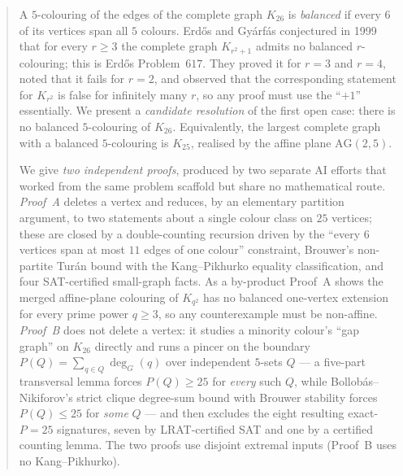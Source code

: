 \documentclass[11pt,reqno]{amsart}
\theoremstyle{definition}
\theoremstyle{remark}
\begin{document}
\begin{abstract}
A $5$-colouring of the edges of the complete graph $K_{26}$ is \emph{balanced} if
every $6$ of its vertices span all $5$ colours. Erd\H{o}s and Gy\'arf\'as
conjectured in 1999 that for every $r\ge 3$ the complete graph $K_{r^2+1}$ admits
no balanced $r$-colouring; this is Erd\H{o}s Problem~$617$. They proved it for
$r=3$ and $r=4$, noted that it fails for $r=2$, and observed that the
corresponding statement for $K_{r^2}$ is false for infinitely many $r$, so any
proof must use the ``$+1$'' essentially. We present a \emph{candidate resolution}
of the first open case: there is no balanced $5$-colouring of $K_{26}$.
Equivalently, the largest complete graph with a balanced $5$-colouring is $K_{25}$,
realised by the affine plane $\mathrm{AG}(2,5)$.

We give \emph{two independent proofs}, produced by two separate AI efforts that
worked from the same problem scaffold but share no mathematical route.
\emph{Proof~A} deletes a vertex and reduces, by an elementary partition argument, to
two statements about a single colour class on $25$ vertices; these are closed by a
double-counting recursion driven by the ``every $6$ vertices span at most $11$ edges
of one colour'' constraint, Brouwer's non-partite Tur\'an bound with the
Kang--Pikhurko equality classification, and four SAT-certified small-graph facts. As
a by-product Proof~A shows the merged affine-plane colouring of $K_{q^2}$ has no
balanced one-vertex extension for every prime power $q\ge 3$, so any counterexample
must be non-affine. \emph{Proof~B} does not delete a vertex: it studies a minority
colour's ``gap graph'' on $K_{26}$ directly and runs a pincer on the boundary
$P(Q)=\sum_{q\in Q}\deg_G(q)$ over independent $5$-sets $Q$ --- a five-part
transversal lemma forces $P(Q)\ge 25$ for \emph{every} such $Q$, while
Bollob\'as--Nikiforov's strict clique degree-sum bound with Brouwer stability forces
$P(Q)\le 25$ for \emph{some} $Q$ --- and then excludes the eight resulting
exact-$P=25$ signatures, seven by LRAT-certified SAT and one by a certified counting
lemma. The two proofs use disjoint extremal inputs (Proof~B uses no Kang--Pikhurko).


\end{abstract}
\end{document}
